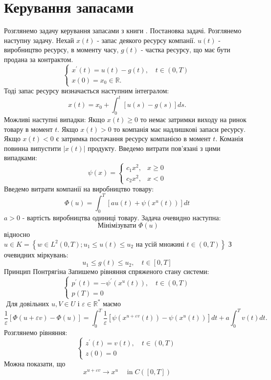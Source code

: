 \documentclass[a4paper,12pt]{extreport}
\begin{document}
\section{Керування запасами}
Розглянемо задачу керування запасами з книги \cite{3}.
Постановка задачі.
Розглянемо наступну задачу. Нехай $x(t)$ - запас деякого ресурсу компанії. $u(t)$ - виробництво ресурсу, в моменту часу,   $g(t)$ - частка ресурсу, що має бути продана за контрактом.
$$
\left\{\begin{array}{l}
x^{\prime}(t)=u(t)-g(t), \quad t \in(0, T) \\
x(0)=x_0 \in \mathbb{R} .
\end{array}\right.
$$
Тоді запас ресурсу визначається наступним інтегралом:
$$
x(t)=x_0+\int_0^t[u(s)-g(s)] d s .
$$
Можливі наступні випадки:
Якщо  $x(t) \geq 0$ то немає затримки виходу на ринок товару в момент $t$.
Якщо  $x(t)>0$ то компанія має надлишкові запаси ресурсу.
Якщо  $x(t)<0$ є затримка постачання ресурсу компанією в момент $t$. Команія повинна випустити $|x(t)|$ продукту.
Введемо витрати пов'язані з цими випадками:
$$
\psi(x)= \begin{cases}c_1 x^2, & x \geq 0 \\ c_2 x^2, & x<0\end{cases}
$$
Введемо витрати компанії на виробництво товару:
$$
\Phi(u)=\int_0^T\left[a u(t)+\psi\left(x^u(t)\right)\right] d t
$$
$a>0$ - вартість виробництва одиниці товару.
Задача очевидно наступна:
$$
\text { Мінімізувати } \Phi(u)
$$
відносно $u \in K=\left\{w \in L^2(0, T) ; u_1 \leq u(t) \leq u_2 \text { на усій множині } t \in(0, T)\right\}$ 
З очевидних міркувань: 
$$
u_1 \leq g(t) \leq u_2, \quad t \in[0, T]
$$
Принцип Понтрягіна 
Запишемо рівняння спряженого стану системи:
$$
\left\{\begin{array}{l}
p^{\prime}(t)=-\psi^{\prime}\left(x^u(t)\right), \quad t \in(0, T) \\
p(T)=0
\end{array}\right.
$$
$\text { Для довільних } u, V \in U \text { і } \varepsilon \in \mathbb{R}^* \text { маємо }$
$$
\frac{1}{\varepsilon}[\Phi(u+\varepsilon v)-\Phi(u)]=\int_0^T \frac{1}{\varepsilon}\left[\psi\left(x^{u+\varepsilon v}(t)\right)-\psi\left(x^u(t)\right)\right] d t+a \int_0^T v(t) d t .
$$
Розглянемо рівняння:
$$
\left\{\begin{array}{l}
z^{\prime}(t)=v(t), \quad t \in(0, T) \\
z(0)=0
\end{array}\right.
$$
Можна показати, що
$$
x^{u+\varepsilon v} \longrightarrow x^u \quad \operatorname{in} C([0, T])
$$
\end{document}
